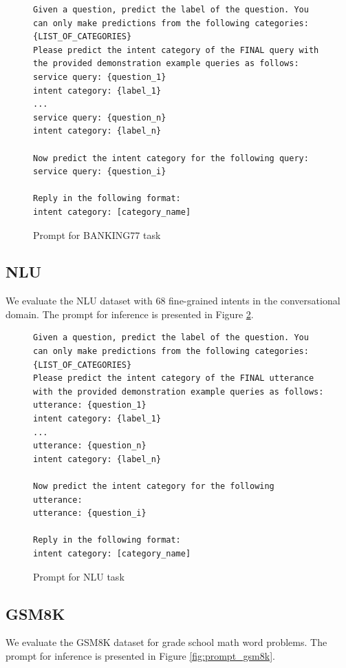 \documentclass{article}
\theoremstyle{plain}
\theoremstyle{definition}
\theoremstyle{remark}
\begin{document}
\begin{figure}[ht]
    \centering
    {\tiny
\begin{lstlisting}
Given a question, predict the label of the question. You can only make predictions from the following categories: {LIST_OF_CATEGORIES}
Please predict the intent category of the FINAL query with the provided demonstration example queries as follows:
service query: {question_1}
intent category: {label_1}
...
service query: {question_n}
intent category: {label_n}

Now predict the intent category for the following query:
service query: {question_i}

Reply in the following format:
intent category: [category_name]
\end{lstlisting}
}
    \caption{Prompt for BANKING77 task}
    \label{fig:prompt_banking77}
\end{figure}



\subsection{NLU}
We evaluate the NLU dataset with 68 fine-grained intents in the conversational domain. The prompt for inference is presented in Figure \ref{fig:prompt_nlu}. %

\begin{figure}[ht]
    \centering
    {\tiny
\begin{lstlisting}
Given a question, predict the label of the question. You can only make predictions from the following categories: {LIST_OF_CATEGORIES}
Please predict the intent category of the FINAL utterance with the provided demonstration example queries as follows:
utterance: {question_1}
intent category: {label_1}
...
utterance: {question_n}
intent category: {label_n}

Now predict the intent category for the following utterance:
utterance: {question_i}

Reply in the following format:
intent category: [category_name]
\end{lstlisting}
}
    \caption{Prompt for NLU task}
    \label{fig:prompt_nlu}
\end{figure}




\subsection{GSM8K}
We evaluate the GSM8K dataset for grade school math word problems. The prompt for inference is presented in Figure \ref{fig:prompt_gsm8k}. %
\end{document}
